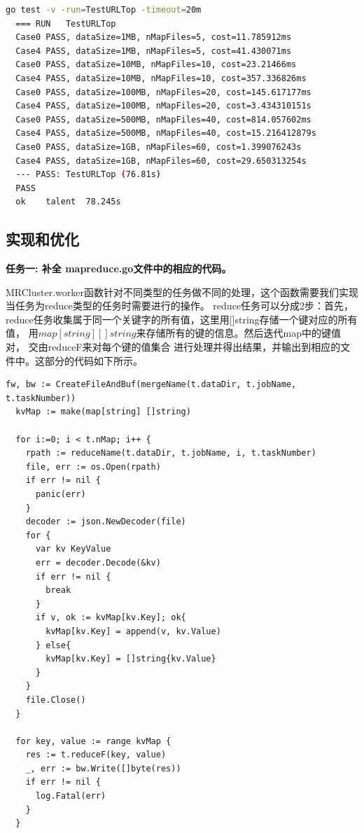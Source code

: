 \documentclass[UTF8]{ctexart}
\begin{document}
\begin{lstlisting}[language={bash}]
  go test -v -run=TestURLTop -timeout=20m
  === RUN   TestURLTop
  Case0 PASS, dataSize=1MB, nMapFiles=5, cost=11.785912ms
  Case4 PASS, dataSize=1MB, nMapFiles=5, cost=41.430071ms
  Case0 PASS, dataSize=10MB, nMapFiles=10, cost=23.21466ms
  Case4 PASS, dataSize=10MB, nMapFiles=10, cost=357.336826ms
  Case0 PASS, dataSize=100MB, nMapFiles=20, cost=145.617177ms
  Case4 PASS, dataSize=100MB, nMapFiles=20, cost=3.434310151s
  Case0 PASS, dataSize=500MB, nMapFiles=40, cost=814.057602ms
  Case4 PASS, dataSize=500MB, nMapFiles=40, cost=15.216412879s
  Case0 PASS, dataSize=1GB, nMapFiles=60, cost=1.399076243s
  Case4 PASS, dataSize=1GB, nMapFiles=60, cost=29.650313254s
  --- PASS: TestURLTop (76.81s)
  PASS
  ok  	talent	78.245s
\end{lstlisting}

\subsection{实现和优化}

\textbf{任务一: 补全 mapreduce.go文件中的相应的代码。}

MRCluster.worker函数针对不同类型的任务做不同的处理，这个函数需要我们实现当任务为reduce类型的任务时需要进行的操作。
reduce任务可以分成2步：首先，reduce任务收集属于同一个关键字的所有值，这里用[]string存储一个键对应的所有值，
用$map[string] []string$来存储所有的键的信息。然后迭代map中的键值对，
交由reduceF来对每个键的值集合 进行处理并得出结果，并输出到相应的文件中。这部分的代码如下所示。
\begin{lstlisting}[language={Golang}]
  fw, bw := CreateFileAndBuf(mergeName(t.dataDir, t.jobName, t.taskNumber))
  kvMap := make(map[string] []string)
  
  for i:=0; i < t.nMap; i++ {
    rpath := reduceName(t.dataDir, t.jobName, i, t.taskNumber)
    file, err := os.Open(rpath)
    if err != nil {
      panic(err)
    }
    decoder := json.NewDecoder(file)
    for {
      var kv KeyValue
      err = decoder.Decode(&kv)
      if err != nil {
        break
      }
      if v, ok := kvMap[kv.Key]; ok{
        kvMap[kv.Key] = append(v, kv.Value)
      } else{
        kvMap[kv.Key] = []string{kv.Value}
      }
    }
    file.Close()
  }
  
  for key, value := range kvMap {
    res := t.reduceF(key, value)
    _, err := bw.Write([]byte(res))
    if err != nil {
      log.Fatal(err)
    }
  }
\end{lstlisting}
\end{document}
